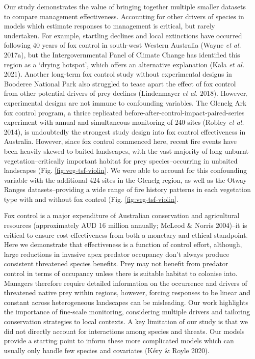 \documentclass[11pt,a4paper,titlepage,twoside,openright]{style/unimelbthesis}
\begin{document}
\begin{mainmatter}
Our study demonstrates the value of bringing together multiple smaller datasets to compare management effectiveness. Accounting for other drivers of species in models which estimate responses to management is critical, but rarely undertaken. For example, startling declines and local extinctions have occurred following 40 years of fox control in south-west Western Australia (Wayne \emph{et al.} 2017a), but the Intergovernmental Panel of Climate Change has identified this region as a `drying hotspot', which offers an alternative explanation (Kala \emph{et al.} 2021). Another long-term fox control study without experimental designs in Booderee National Park also struggled to tease apart the effect of fox control from other potential drivers of prey declines (Lindenmayer \emph{et al.} 2018). However, experimental designs are not immune to confounding variables. The Glenelg Ark fox control program, a thrice replicated before-after-control-impact-paired-series experiment with annual and simultaneous monitoring of 240 sites (Robley \emph{et al.} 2014), is undoubtedly the strongest study design into fox control effectiveness in Australia. However, since fox control commenced here, recent fire events have been heavily skewed to baited landscapes, with the vast majority of long-unburnt vegetation--critically important habitat for prey species--occurring in unbaited landscapes (Fig. \ref{fig:veg-tsf-violin}. We were able to account for this confounding variable with the additional 424 sites in the Glenelg region, as well as the Otway Ranges datasets--providing a wide range of fire history patterns in each vegetation type with and without fox control (Fig. \ref{fig:veg-tsf-violin}.

Fox control is a major expenditure of Australian conservation and agricultural resources (approximately AUD 16 million annually; McLeod \& Norris 2004)--it is critical to ensure cost-effectiveness from both a monetary and ethical standpoint. Here we demonstrate that effectiveness is a function of control effort, although, large reductions in invasive apex predator occupancy don't always produce consistent threatened species benefits. Prey may not benefit from predator control in terms of occupancy unless there is suitable habitat to colonise into. Managers therefore require detailed information on the occurrence and drivers of threatened native prey within regions, however, forcing responses to be linear and constant across heterogeneous landscapes can be misleading. Our work highlights the importance of fine-scale monitoring, considering multiple drivers and tailoring conservation strategies to local contexts. A key limitation of our study is that we did not directly account for interactions among species and threats. Our models provide a starting point to inform these more complicated models which can usually only handle few species and covariates (Kéry \& Royle 2020).


\end{mainmatter}
\end{document}
